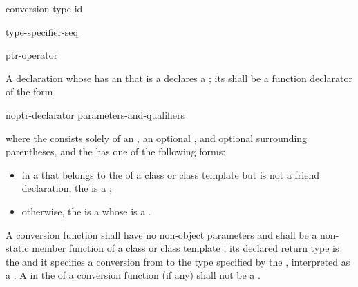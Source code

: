 \begin{bnf}
\br
     conversion-type-id
\end{bnf}

\begin{bnf}
\br
    type-specifier-seq 
\end{bnf}

\begin{bnf}
\br
    ptr-operator 
\end{bnf}

\pnum
A declaration
whose  has
an  that is a 
declares a ;
its  shall be
a function declarator of the form
\begin{ncsimplebnf}
noptr-declarator parameters-and-qualifiers
\end{ncsimplebnf}
where the  consists solely of
an ,
an optional , and
optional surrounding parentheses, and
the  has one of the following forms:
\begin{itemize}
\item
in a  that belongs to
the  of a class or class template
but is not a friend declaration,
the  is a ;
\item
otherwise, the  is a 
whose  is a .
\end{itemize}

\pnum
A conversion function  shall have no non-object parameters and
shall be a non-static member function of a class or class template ;
its declared return type is the  and
it specifies a conversion from  to
the type specified by the ,
interpreted as a .
A  in the 
of a conversion function (if any) shall not be
a .

